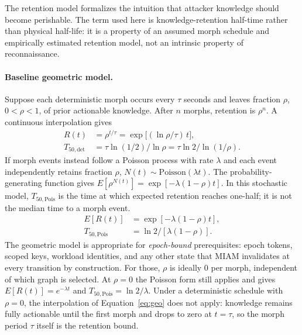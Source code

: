\documentclass[11pt,letterpaper]{article}
\begin{document}
The retention model formalizes the intuition that attacker knowledge should become perishable. The term used here is knowledge-retention half-time rather than physical half-life: it is a property of an assumed morph schedule and empirically estimated retention model, not an intrinsic property of reconnaissance.

\paragraph{Baseline geometric model.} Suppose each deterministic morph occurs every $\tau$ seconds and leaves fraction $\rho$, $0<\rho<1$, of prior actionable knowledge. After $n$ morphs, retention is $\rho^n$. A continuous interpolation gives
\begin{align}
R(t)&=\rho^{t/\tau}=\exp\!\big[(\ln\rho/\tau)\,t\big],\label{eq:geo}\\
T_{50,\mathrm{det}}&=\tau\ln(1/2)/\ln\rho=\tau\ln2/\ln(1/\rho).\label{eq:t50det}
\end{align}
If morph events instead follow a Poisson process with rate $\lambda$ and each event independently retains fraction $\rho$, $N(t)\sim\mathrm{Poisson}(\lambda t)$. The probability-generating function gives $E[\rho^{N(t)}]=\exp[-\lambda(1-\rho)t]$. In this stochastic model, $T_{50,\mathrm{Pois}}$ is the time at which expected retention reaches one-half; it is not the median time to a morph event.
\begin{align}
E[R(t)]&=\exp[-\lambda(1-\rho)t],\label{eq:pois}\\
T_{50,\mathrm{Pois}}&=\ln2/[\lambda(1-\rho)].\label{eq:t50pois}
\end{align}
The geometric model is appropriate for \emph{epoch-bound} prerequisites: epoch tokens, scoped keys, workload identities, and any other state that MIAM invalidates at every transition by construction. For those, $\rho$ is ideally 0 per morph, independent of which graph is selected. At $\rho=0$ the Poisson form still applies and gives $E[R(t)]=e^{-\lambda t}$ and $T_{50,\mathrm{Pois}}=\ln2/\lambda$. Under a deterministic schedule with $\rho=0$, the interpolation of Equation~\eqref{eq:geo} does not apply: knowledge remains fully actionable until the first morph and drops to zero at $t=\tau$, so the morph period $\tau$ itself is the retention bound.
\end{document}
